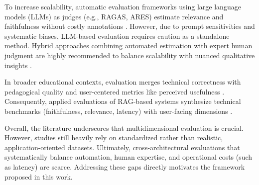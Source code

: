 To increase scalability, automatic evaluation frameworks using large language models (LLMs) as judges (e.g., RAGAS, ARES) estimate relevance and faithfulness without costly annotations \autocite{es2025ragas, saadfalcon2024ares}. However, due to prompt sensitivities and systematic biases, LLM-based evaluation requires caution as a standalone method. Hybrid approaches combining automated estimation with expert human judgment are highly recommended to balance scalability with nuanced qualitative insights \autocite{bdcc9120320, 202504.0369}.

In broader educational contexts, evaluation merges technical correctness with pedagogical quality and user-centered metrics like perceived usefulness \autocite{Neumann2024MoodleBot}. Consequently, applied evaluations of RAG-based systems synthesize technical benchmarks (faithfulness, relevance, latency) with user-facing dimensions \autocite{khan2025ragbenchmark}.

Overall, the literature underscores that multidimensional evaluation is crucial. However, studies still heavily rely on standardized rather than realistic, application-oriented datasets. Ultimately, cross-architectural evaluations that systematically balance automation, human expertise, and operational costs (such as latency) are scarce. Addressing these gaps directly motivates the framework proposed in this work.